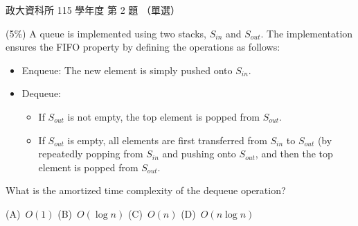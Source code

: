 \begin{pastexam}[label={px:nccu-115-dsa-02}]{政大資科所 115 學年度 第 2 題}
（單選）

(5\%) A queue is implemented using two stacks, $S_{in}$ and $S_{out}$. The implementation ensures the
FIFO property by defining the operations as follows:
\begin{itemize}
\item Enqueue: The new element is simply pushed onto $S_{in}$.
\item Dequeue:
\begin{itemize}
\item If $S_{out}$ is not empty, the top element is popped from $S_{out}$.
\item If $S_{out}$ is empty, all elements are first transferred from $S_{in}$ to $S_{out}$ (by repeatedly
popping from $S_{in}$ and pushing onto $S_{out}$, and then the top element is popped from $S_{out}$.
\end{itemize}
\end{itemize}
What is the amortized time complexity of the dequeue operation?

(A)~$O(1)$ \qquad (B)~$O(\log n)$ \qquad (C)~$O(n)$ \qquad (D)~$O(n\log n)$
\end{pastexam}

